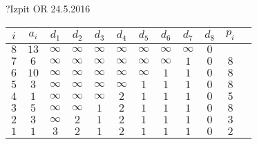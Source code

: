 \begin{naloga}{?}{Izpit OR 24.5.2016}
\begin{odgovor}
\begin{enumerate}[(a)]
\begin{tabela}
\begin{tabular}{cc|cccccccccc}
$i$ & $a_i$ & $d_1$ & $d_2$ & $d_3$ & $d_4$ & $d_5$ & $d_6$ & $d_7$ & $d_8$ & $p_i$\\ \hline
$8$ & $13$ & $\infty$ & $\infty$ & $\infty$ & $\infty$ & $\infty$ & $\infty$ & $\infty$ & $0$ & \\
$7$ & $6$ & $\infty$ & $\infty$ & $\infty$ & $\infty$ & $\infty$ & $\infty$ & $1$ & $0$ & $8$\\
$6$ & $10$ & $\infty$ & $\infty$ & $\infty$ & $\infty$ & $\infty$ & $1$ & $1$ & $0$ & $8$\\
$5$ & $3$ & $\infty$ & $\infty$ & $\infty$ & $\infty$ & $1$ & $1$ & $1$ & $0$ & $8$\\
$4$ & $1$ & $\infty$ & $\infty$ & $\infty$ & $2$ & $1$ & $1$ & $1$ & $0$ & $5$\\
$3$ & $5$ & $\infty$ & $\infty$ & $1$ & $2$ & $1$ & $1$ & $1$ & $0$ & $8$\\
$2$ & $3$ & $\infty$ & $2$ & $1$ & $2$ & $1$ & $1$ & $1$ & $0$ & $3$\\
$1$ & $1$ & $3$ & $2$ & $1$ & $2$ & $1$ & $1$ & $1$ & $0$ & $2$
\end{tabular}
\end{tabela}


\end{enumerate}

\end{odgovor}
\end{naloga}
